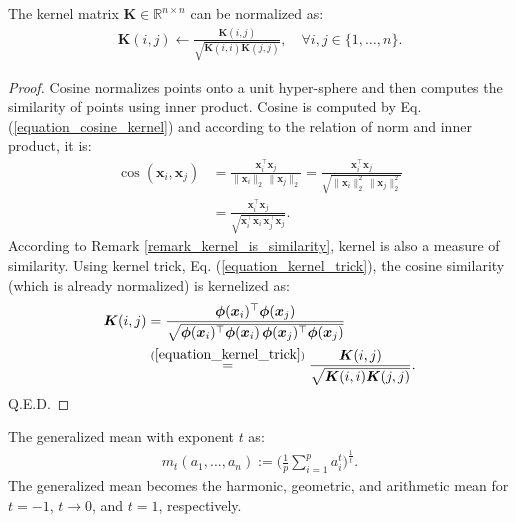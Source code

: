 \documentclass[lang=cn,10pt]{gorgeousnbook}
\numberwithin{equation}{section}%
\numberwithin{figure}{section}%
\begin{document}
\begin{lemma}
The kernel matrix $\boldsymbol{K} \in \mathbb{R}^{n \times n}$ can be normalized as:
\begin{align}
\boldsymbol{K}(i,j) \gets \frac{\boldsymbol{K}(i,j)}{\sqrt{\boldsymbol{K}(i,i) \boldsymbol{K}(j,j)}}, \quad \forall i,j \in \{1, \dots, n\}.
\end{align}
\end{lemma}
\begin{proof}
Cosine normalizes points onto a unit hyper-sphere and then computes the similarity of points using inner product. Cosine is computed by Eq. (\ref{equation_cosine_kernel}) and according to the relation of norm and inner product, it is:
\begin{align*}
\cos(\boldsymbol{x}_i, \boldsymbol{x}_j) &= \frac{\boldsymbol{x}_i^\top \boldsymbol{x}_j}{\|\boldsymbol{x}_i\|_2\, \|\boldsymbol{x}_j\|_2} = \frac{\boldsymbol{x}_i^\top \boldsymbol{x}_j}{\sqrt{\|\boldsymbol{x}_i\|_2^2\, \|\boldsymbol{x}_j\|_2^2}} \\
&= \frac{\boldsymbol{x}_i^\top \boldsymbol{x}_j}{\sqrt{\boldsymbol{x}_i^\top \boldsymbol{x}_i\, \boldsymbol{x}_j^\top \boldsymbol{x}_j}}.
\end{align*}
According to Remark \ref{remark_kernel_is_similarity}, kernel is also a measure of similarity. 
Using kernel trick, Eq. (\ref{equation_kernel_trick}), the cosine similarity (which is already normalized) is kernelized as:
\begin{align*}
\boldsymbol{K}(i,j) &= \frac{\boldsymbol{\phi}(\boldsymbol{x}_i)^\top \boldsymbol{\phi}(\boldsymbol{x}_j)}{\sqrt{ \boldsymbol{\phi}(\boldsymbol{x}_i)^\top \boldsymbol{\phi}(\boldsymbol{x}_i)\, \boldsymbol{\phi}(\boldsymbol{x}_j)^\top \boldsymbol{\phi}(\boldsymbol{x}_j) }} \\
&\overset{(\ref{equation_kernel_trick})}{=} \frac{\boldsymbol{K}(i,j)}{\sqrt{\boldsymbol{K}(i,i) \boldsymbol{K}(j,j)}}. 
\end{align*}
Q.E.D.
\end{proof}

\begin{definition}
The generalized mean with exponent $t$ as:
\begin{align}\label{equation_generalized_mean}
m_t(a_1, \dots, a_n) := \Big(\frac{1}{p} \sum_{i=1}^p a_i^t\Big)^{\frac{1}{t}}.
\end{align}
The generalized mean becomes the harmonic, geometric, and arithmetic mean for $t=-1$, $t \rightarrow 0$, and $t=1$, respectively.
\end{definition}
\end{document}
